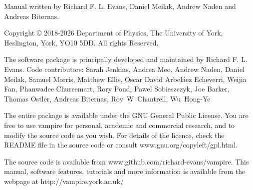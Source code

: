 \noindent Manual written by Richard F. L. Evans, Daniel Meilak, Andrew Naden and
Andreas Biternas.\\
\par
\noindent Copyright \copyright \xspace 2018-2026 Department of Physics, The
University of York, Heslington, York, YO10 5DD. All rights Reserved.\\
\par
\noindent The \vampire software package is principally developed and maintained
by Richard F. L. Evans. Code contributors: Sarah Jenkins, Andrea Meo, Andrew Naden,
Daniel Meilak, Samuel Morris, Matthew Ellis, Oscar David Arbel\'aez Echeverri,
Weijia Fan, Phanwadee Chureemart, Rory Pond, Pawel Sobieszczyk, Joe Barker,
Thomas Ostler, Andreas Biternas, Roy~W~Chantrell, Wu~Hong-Ye\\
\par
\noindent The entire \vampire package is available under the GNU General
Public License. You are free to use vampire for personal, academic and
commercial research, and to modify the source code as you wish. For details of
the licence, check the README file in the source code or consult
www.gnu.org/copyleft/gpl.html.\\
\par
\noindent The \vampire source code is available from
www.github.com/richard-evans/vampire. This manual, software features, tutorials
and more information is available from the \vampire webpage at
http://vampire.york.ac.uk/\\
